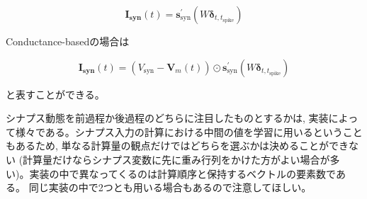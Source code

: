 \begin{equation}

\boldsymbol{I_{\text{syn}}}(t)=\boldsymbol{s}^\prime_{\text{syn}}(W\boldsymbol{\delta}_{t,t_{\text{spike}}})  

\end{equation}





Conductance-basedの場合は





\begin{equation}

\boldsymbol{I_{\text{syn}}}(t)=\left(V_{\text{syn}}-\boldsymbol{V}_{m}(t)\right)\odot \boldsymbol{s}^\prime_{\text{syn}}(W\boldsymbol{\delta}_{t,t_{\text{spike}}})

\end{equation}





と表すことができる。



シナプス動態を前過程か後過程のどちらに注目したものとするかは, 実装によって様々である。シナプス入力の計算における中間の値を学習に用いるということもあるため, 単なる計算量の観点だけではどちらを選ぶかは決めることができない (計算量だけならシナプス変数に先に重み行列をかけた方がよい場合が多い)。実装の中で異なってくるのは計算順序と保持するベクトルの要素数である。 同じ実装の中で2つとも用いる場合もあるので注意してほしい。

